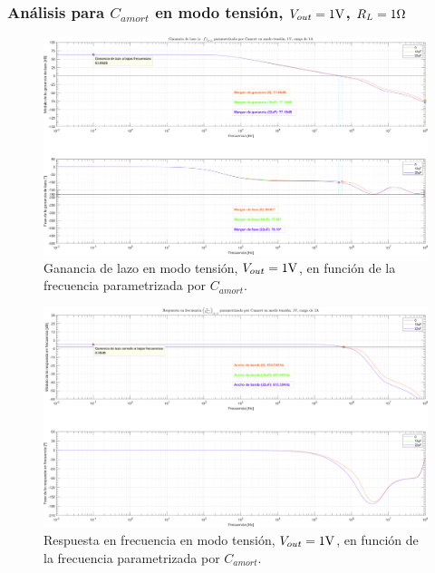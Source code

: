 \clearpage


\subsubsection{Análisis para $C_{amort}$ en modo tensión, $V_{out} = 1 \si[per-mode=symbol]{\volt}$, $R_{L} = 1 \si[per-mode=symbol]{\ohm}$}

\clearpage

\begin{figure}[H] %
\begin{center}
\includegraphics[width=1.1 \textwidth, angle=90]{./img/plots/loop/power_supply_CAMORT_LOOP_Modo2.png}
\caption{\label{fig:fig_power_supply_CAMORT_LOOP_Modo2}\footnotesize{Ganancia de lazo en modo tensión, $V_{out} = 1 \si[per-mode=symbol]{\volt}$, en función de la frecuencia parametrizada por $C_{amort}$.}}
\end{center}
\end{figure}


\clearpage

\begin{figure}[H] %
\begin{center}
\includegraphics[width=1.1 \textwidth, angle=90]{./img/plots/rf/power_supply_CAMORT_RF_Modo2.png}
\caption{\label{fig:fig_power_supply_CAMORT_RF_Modo2}\footnotesize{Respuesta en frecuencia en modo tensión, $V_{out} = 1 \si[per-mode=symbol]{\volt}$, en función de la frecuencia parametrizada por $C_{amort}$.}}
\end{center}
\end{figure}

